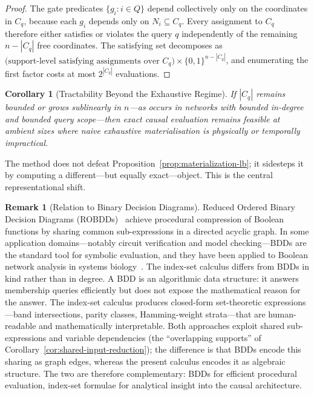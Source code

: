\documentclass[11pt]{article}
\newtheorem{corollary}{Corollary}
\theoremstyle{definition}
\newtheorem{remark}{Remark}
\begin{document}
\begin{proof}
The gate predicates \(\{g_i:i\in Q\}\) depend collectively only on the coordinates in \(C_q\),
because each \(g_i\) depends only on \(N_i\subseteq C_q\). Every assignment to \(C_q\) therefore
either satisfies or violates the query \(q\) independently of the remaining \(n-|C_q|\) free
coordinates. The satisfying set decomposes as
\(\bigl(\text{support-level satisfying assignments over }C_q\bigr)\times\{0,1\}^{n-|C_q|}\),
and enumerating the first factor costs at most \(2^{|C_q|}\) evaluations.
\end{proof}

\begin{corollary}[Tractability Beyond the Exhaustive Regime]\label{cor:tractability}
If \(|C_q|\) remains bounded or grows sublinearly in \(n\)---as occurs in networks with bounded
in-degree and bounded query scope---then exact causal evaluation remains feasible at ambient sizes
where naive exhaustive materialisation is physically or temporally impractical.
\end{corollary}

The method does not defeat Proposition~\ref{prop:materialization-lb}; it sidesteps it by computing
a different---but equally exact---object. This is the central representational shift.

\begin{remark}[Relation to Binary Decision Diagrams]
Reduced Ordered Binary Decision Diagrams (ROBDDs)~\cite{bryant1986graph} achieve procedural
compression of Boolean functions by sharing common sub-expressions in a directed acyclic graph.
In some application domains---notably circuit verification and model checking---BDDs are the
standard tool for symbolic evaluation, and they have been applied to Boolean network analysis in
systems biology~\cite{velizcuba2014reduction}. The index-set calculus differs from BDDs in kind
rather than in degree. A BDD is an algorithmic data structure: it answers membership queries
efficiently but does not expose the mathematical reason for the answer. The index-set calculus
produces closed-form set-theoretic expressions---band intersections, parity classes,
Hamming-weight strata---that are human-readable and mathematically interpretable. Both approaches
exploit shared sub-expressions and variable dependencies (the ``overlapping supports'' of
Corollary~\ref{cor:shared-input-reduction}); the difference is that BDDs encode this sharing as
graph edges, whereas the present calculus encodes it as algebraic structure. The two are therefore
complementary: BDDs for efficient procedural evaluation, index-set formulae for analytical
insight into the causal architecture.
\end{remark}
\end{document}
